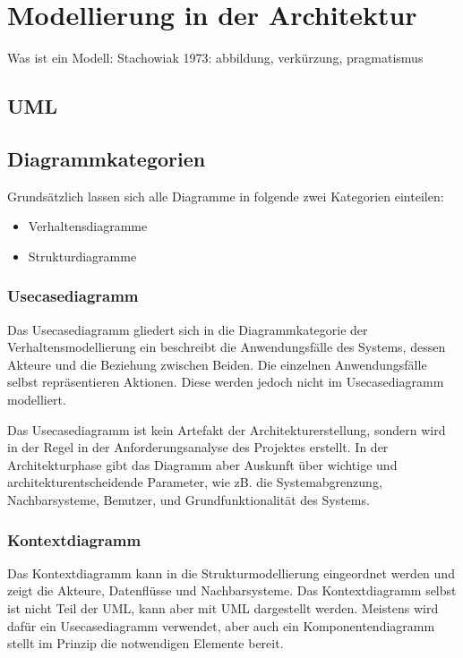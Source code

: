 \chapter{Modellierung in der Architektur}
Was ist ein Modell: Stachowiak 1973: abbildung, verkürzung, pragmatismus

\cite[S. 264]{softarch}

\cite[S. 13]{reqanalysis}
\cite[S. 139]{effektiv}

\cite[S. 93]{glasklar}


\section{UML}


\section{Diagrammkategorien}
Grundsätzlich lassen sich alle Diagramme in folgende zwei Kategorien einteilen:

\begin{itemize}
  \item Verhaltensdiagramme
  \item Strukturdiagramme
\end{itemize}


\subsection{Usecasediagramm}
Das Usecasediagramm gliedert sich in die Diagrammkategorie der Verhaltensmodellierung ein beschreibt die Anwendungsfälle des Systems, dessen Akteure und die Beziehung zwischen Beiden. Die einzelnen Anwendungsfälle selbst repräsentieren Aktionen. Diese werden jedoch nicht im Usecasediagramm modelliert.\cite[S. 242-245]{glasklar}

Das Usecasediagramm ist kein Artefakt der Architekturerstellung, sondern wird in der Regel in der Anforderungsanalyse des Projektes erstellt. In der Architekturphase gibt das Diagramm aber Auskunft über wichtige und architekturentscheidende Parameter, wie zB. die Systemabgrenzung, Nachbarsysteme, Benutzer, und Grundfunktionalität des Systems. \cite[S. 148]{basiswissen}

\subsection{Kontextdiagramm}
Das Kontextdiagramm kann in die Strukturmodellierung eingeordnet werden und zeigt die Akteure, Datenflüsse und Nachbarsysteme. Das Kontextdiagramm selbst ist nicht Teil der UML, kann aber mit UML dargestellt werden. Meistens wird dafür ein Usecasediagramm verwendet, aber auch ein Komponentendiagramm stellt im Prinzip die notwendigen Elemente bereit. \cite[S. 255]{glasklar}

